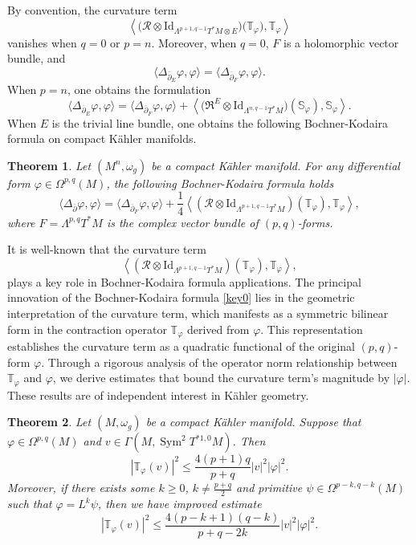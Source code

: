 \documentclass[12pt, reqno]{amsart}
\DeclareMathOperator*{\Sym}{Sym}
\newcommand\bp{{\bar\partial}}
\theoremstyle{plain}
\newtheorem{thm}{Theorem}[section]
\theoremstyle{definition}
\newcommand{\btheorem}{\begin{thm}}
\newcommand{\etheorem}{\end{thm}}
\newcommand{\la}{\langle}
\newcommand{\ra}{\rangle}
\newcommand{\p}{\partial}
\renewcommand{\bar}{\overline}
\renewcommand{\phi}{\varphi}
\newcommand{\beq}{\begin{equation}}
\newcommand{\eeq}{\end{equation}}
\renewcommand{\bp}{\bar{\partial}}
\newcommand{\ts}{\otimes}
\renewcommand{\>}{\rightarrow}
\renewcommand{\#}{\sharp}
\numberwithin{equation}{section} %
\begin{document}
\noindent    By convention, the curvature term $$\left\langle \big(\mathcal{R}\otimes \mathrm{Id}_{\Lambda^{p+1,q-1}T^*M\ts E}\big)\big(\mathbb{T}_{\phi}\big),\mathbb{T}_{\phi} \right\rangle$$ vanishes when $q=0$ or $p=n$. Moreover, when $q=0$, $F$ is a holomorphic vector bundle, and \beq \langle\Delta_{\bar \p_E}\phi,\phi\rangle = \langle \Delta_{\bp_F}  \phi, \phi\rangle. \eeq
\noindent When $p=n$, one obtains the formulation
    \beq \langle\Delta_{\bar \p_E}\phi,\phi\rangle = \langle \Delta_{\bp_F}  \phi, \phi\rangle  + \left\langle \big(\mathfrak{R}^E \otimes \mathrm{Id}_{\Lambda^{n,q-1}T^*M}\big) \left(\mathbb{S}_\phi\right), \mathbb{S}_\phi \right\rangle. \eeq
    \noindent When $E$ is the trivial line bundle, one obtains the following Bochner-Kodaira formula on compact K\"ahler manifolds.


    \btheorem\label{main1} Let $(M^n,\omega_g)$ be a compact K\"ahler manifold.
    For any   differential form $ \phi \in \Omega^{p,q}(M) $, the following Bochner-Kodaira formula holds
    \beq  \la\Delta_{\bar \p} \phi ,\phi \ra =\la \Delta_{\bp_F} \phi ,\phi \ra +\frac{1}{4}\left\langle \left(\mathcal {R} \otimes \mathrm{Id}_{\Lambda^{p+1,q-1}T^*M}\right)(\mathbb T_\phi ),\mathbb T_\phi  \right\rangle, \label{key0}
    \eeq
    where $F=\Lambda^{p,q}T^*M$ is the  complex vector bundle of
    $(p,q)$-forms.
    \etheorem

    \noindent   It is well-known that the curvature term \beq\left\langle \left(\mathcal {R} \otimes \mathrm{Id}_{\Lambda^{p+1,q-1}T^*M}\right)\left(\mathbb T_\phi \right),\mathbb T_\phi  \right \rangle,\label{curvatureterm}\eeq  plays a key role in Bochner-Kodaira formula applications. The principal innovation of the Bochner-Kodaira formula \eqref{key0} lies in the geometric interpretation of the curvature term, which manifests as a symmetric bilinear form in the contraction operator $\mathbb T_\phi$ derived from $\phi$.  This representation establishes the curvature term as a quadratic functional of the original $(p,q)$-form $\phi$.
Through a rigorous analysis of the operator norm relationship between $\mathbb T_\phi $ and $\phi $,  we derive estimates that bound the curvature term's magnitude by  $|\phi |$. These results are of independent interest in K\"ahler geometry.
    \btheorem
    \label{main3}
    Let  $(M,\omega_g)$ be a compact K\"ahler manifold. Suppose that $ \phi \in \Omega^{p,q}(M) $ and $ v \in \Gamma\left(M,\Sym^2 T^{*1,0}M\right) $. Then 
    \beq |\mathbb T_\phi(v)|^2 \leq \frac{4(p+1)q}{p+q} |v|^2 |\phi|^2.\eeq 
    Moreover, if  there exists some $k\geq 0$, $k\neq \frac{p+q}{2}$ and primitive $\psi\in \Omega^{p-k,q-k}(M) $ such that  $\phi=L^k\psi $,
    then we have improved estimate
    \beq |\mathbb T_\phi(v)|^2 \leq \frac{4(p-k+1)(q-k)}{p+q-2k} |v|^2 |\phi|^2.\label{key00}\eeq
    \etheorem
\end{document}
